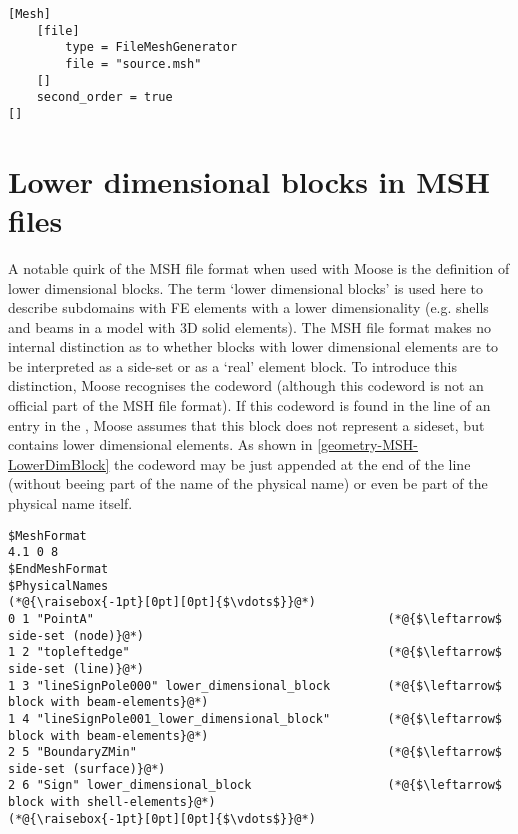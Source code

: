 \begin{lstlisting}[language=Moose, float, caption={Read mesh from a file},label={geometry-FileMeshGenerator}]
[Mesh]
    [file]
        type = FileMeshGenerator
        file = "source.msh"
    []
    second_order = true
[]
\end{lstlisting}

\section{Lower dimensional blocks in MSH files}
\label{geometry-MSH}

A notable quirk of the MSH file format when used with Moose is the definition
of lower dimensional blocks. The term ‘lower dimensional blocks’ is used here
to describe subdomains with FE elements with a lower dimensionality (e.g.
shells and beams in a model with 3D solid elements). The MSH file format makes
no internal distinction as to whether blocks with lower dimensional elements
are to be interpreted as a side-set or as a ‘real’ element block. To introduce
this distinction, Moose recognises the codeword
 (although this codeword is not an official
part of the MSH file format). If this codeword is found in the line of an entry
in the , Moose assumes that this block does not
represent a sideset, but contains lower dimensional elements. As shown in
\autoref{geometry-MSH-LowerDimBlock} the codeword may be just appended at the
end of the line (without beeing part of the name of the physical name) or even
be part of the physical name itself.

\begin{lstlisting}[float, caption={Fragment of an MSH file containing ‘lower dimensional blocks’},label={geometry-MSH-LowerDimBlock}]
$MeshFormat
4.1 0 8
$EndMeshFormat
$PhysicalNames
(*@{\raisebox{-1pt}[0pt][0pt]{$\vdots$}}@*)
0 1 "PointA"                                         (*@{$\leftarrow$ side-set (node)}@*)
1 2 "topleftedge"                                    (*@{$\leftarrow$ side-set (line)}@*)
1 3 "lineSignPole000" lower_dimensional_block        (*@{$\leftarrow$ block with beam-elements}@*)
1 4 "lineSignPole001_lower_dimensional_block"        (*@{$\leftarrow$ block with beam-elements}@*)
2 5 "BoundaryZMin"                                   (*@{$\leftarrow$ side-set (surface)}@*)
2 6 "Sign" lower_dimensional_block                   (*@{$\leftarrow$ block with shell-elements}@*)
(*@{\raisebox{-1pt}[0pt][0pt]{$\vdots$}}@*)
\end{lstlisting}

